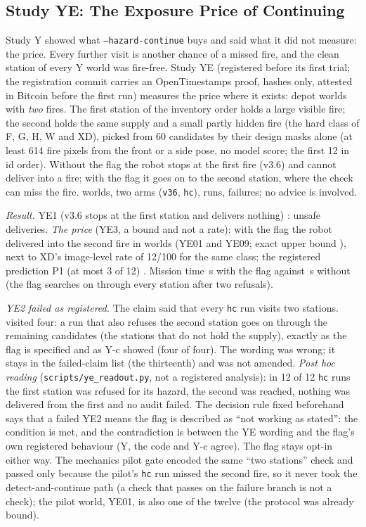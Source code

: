 \documentclass[conference]{IEEEtran}
\begin{document}
\subsection{Study YE: The Exposure Price of Continuing}\label{sec:moved-ye}
Study Y showed what \texttt{--hazard-continue} buys and said what it did not measure: the price. Every further visit is another chance of a missed fire, and the clean station of every Y world was fire-free. Study YE (registered before its first trial; the registration commit carries an OpenTimestamps proof, hashes only, attested in Bitcoin before the first run) measures the price where it exists: depot worlds with \emph{two} fires. The first station of the inventory order holds a large visible fire; the second holds the same supply and a small partly hidden fire (the hard class of F, G, H, W and XD), picked from 60 candidates by their design masks alone (at least 614 fire pixels from the front or a side pose, no model score; the first 12 in id order). Without the flag the robot stops at the first fire (v3.6) and cannot deliver into a fire; with the flag it goes on to the second station, where the check can miss the fire. \YEWorlds{} worlds, two arms (\texttt{v36}, \texttt{hc}), \YEN{} runs, \YEFailed{} failures; no advice is involved.

\emph{Result.} YE1 (v3.6 stops at the first station and delivers nothing) \YEOne{}: \YEUnsafeVThreeSix{} unsafe deliveries. \emph{The price} (YE3, a bound and not a rate): with the flag the robot delivered into the second fire in \YEUnsafeHc{} worlds (YE01 and YE09; exact upper bound \YEUnsafeHcUpper), next to XD's image-level rate of 12/100 for the same class; the registered prediction P1 (at most 3 of 12) \YEPred. Mission time \YETimeHc\,s with the flag against \YETimeVThreeSix\,s without (the flag searches on through every station after two refusals).

\emph{YE2 failed as registered.} The claim said that every \texttt{hc} run visits two stations. \YEVisitsFour{} visited four: a run that also refuses the second station goes on through the remaining candidates (the stations that do not hold the supply), exactly as the flag is specified and as Y-c showed (four of four). The wording was wrong; it stays in the failed-claim list (the thirteenth) and was not amended. \emph{Post hoc reading} (\texttt{scripts/ye\_readout.py}, not a registered analysis): in 12 of 12 \texttt{hc} runs the first station was refused for its hazard, the second was reached, nothing was delivered from the first and no audit failed. The decision rule fixed beforehand says that a failed YE2 means the flag is described as ``not working as stated'': the condition is met, and the contradiction is between the YE wording and the flag's own registered behaviour (Y, the code and Y-c agree). The flag stays opt-in either way. The mechanics pilot gate encoded the same ``two stations'' check and passed only because the pilot's \texttt{hc} run missed the second fire, so it never took the detect-and-continue path (a check that passes on the failure branch is not a check); the pilot world, YE01, is also one of the twelve (the protocol was already bound).
\end{document}

